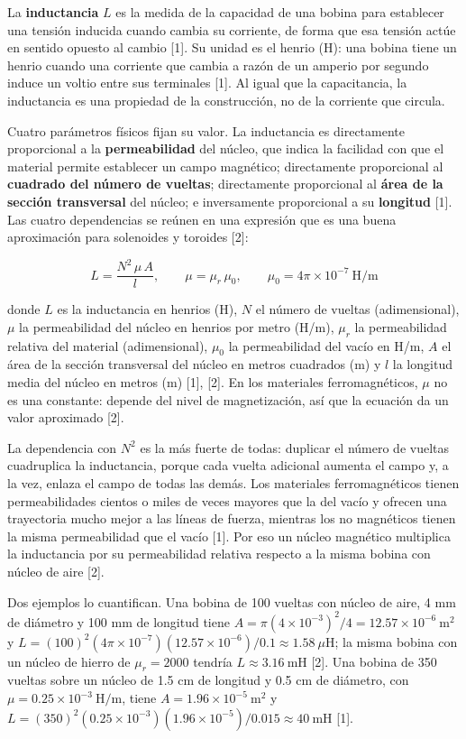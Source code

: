 \documentclass[11pt,letterpaper]{article}
\begin{document}
La \textbf{inductancia} $L$ es la medida de la capacidad de una bobina para establecer una tensión inducida cuando cambia su corriente, de forma que esa tensión actúe en sentido opuesto al cambio [1]. Su unidad es el henrio (H): una bobina tiene un henrio cuando una corriente que cambia a razón de un amperio por segundo induce un voltio entre sus terminales [1]. Al igual que la capacitancia, la inductancia es una propiedad de la construcción, no de la corriente que circula.

Cuatro parámetros físicos fijan su valor. La inductancia es directamente proporcional a la \textbf{permeabilidad} del núcleo, que indica la facilidad con que el material permite establecer un campo magnético; directamente proporcional al \textbf{cuadrado del número de vueltas}; directamente proporcional al \textbf{área de la sección transversal} del núcleo; e inversamente proporcional a su \textbf{longitud} [1]. Las cuatro dependencias se reúnen en una expresión que es una buena aproximación para solenoides y toroides [2]:

\begin{equation}
  L = \frac{N^{2}\,\mu\,A}{l}, \qquad \mu = \mu_r\,\mu_0, \qquad \mu_0 = 4\pi \times 10^{-7}\ \text{H/m}
\end{equation}

donde $L$ es la inductancia en henrios (H), $N$ el número de vueltas (adimensional), $\mu$ la permeabilidad del núcleo en henrios por metro (H/m), $\mu_r$ la permeabilidad relativa del material (adimensional), $\mu_0$ la permeabilidad del vacío en H/m, $A$ el área de la sección transversal del núcleo en metros cuadrados (m\texttwosuperior{}) y $l$ la longitud media del núcleo en metros (m) [1], [2]. En los materiales ferromagnéticos, $\mu$ no es una constante: depende del nivel de magnetización, así que la ecuación da un valor aproximado [2].

La dependencia con $N^2$ es la más fuerte de todas: duplicar el número de vueltas cuadruplica la inductancia, porque cada vuelta adicional aumenta el campo y, a la vez, enlaza el campo de todas las demás. Los materiales ferromagnéticos tienen permeabilidades cientos o miles de veces mayores que la del vacío y ofrecen una trayectoria mucho mejor a las líneas de fuerza, mientras los no magnéticos tienen la misma permeabilidad que el vacío [1]. Por eso un núcleo magnético multiplica la inductancia por su permeabilidad relativa respecto a la misma bobina con núcleo de aire [2].

Dos ejemplos lo cuantifican. Una bobina de 100 vueltas con núcleo de aire, 4 mm de diámetro y 100 mm de longitud tiene $A = \pi (4 \times 10^{-3})^2/4 = 12.57 \times 10^{-6}\ \text{m}^2$ y $L = (100)^2 (4\pi \times 10^{-7})(12.57 \times 10^{-6}) / 0.1 \approx 1.58\ \mu\text{H}$; la misma bobina con un núcleo de hierro de $\mu_r = 2000$ tendría $L \approx 3.16\ \text{mH}$ [2]. Una bobina de 350 vueltas sobre un núcleo de 1.5 cm de longitud y 0.5 cm de diámetro, con $\mu = 0.25 \times 10^{-3}\ \text{H/m}$, tiene $A = 1.96 \times 10^{-5}\ \text{m}^2$ y $L = (350)^2 (0.25 \times 10^{-3})(1.96 \times 10^{-5}) / 0.015 \approx 40\ \text{mH}$ [1].
\end{document}
